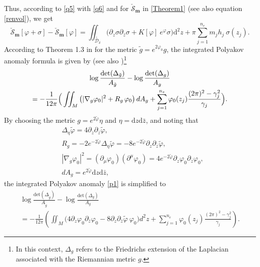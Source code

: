 \documentclass[a4paper,11pt]{article}
\newcommand{\dd}{\mathrm{d}}
\newcommand{\singfund}{\overset{{}_{\curlywedge}}{\mathcal{D}}}
\begin{document}
Thus, according to \eqref{q5} with \eqref{q6} and for $\check{\mathscr{S}}_{\boldsymbol{m}}$ in \eqref{Theorem1} (see also equation \eqref{renvol}), we get
\begin{equation}
\check{\mathscr{S}}_{\boldsymbol{m}}[\varphi+\sigma]-\check{\mathscr{S}}_{\boldsymbol{m}}[\varphi] = \iint_{\singfund_{\delta}}\Big(\partial_z \sigma\partial_{\bar{z}}\sigma +  K[\varphi] ~e^{\varphi} \sigma\Big) \dd^{2}z +\pi \sum_{j=1}^{n_e} m_j h_j~ \sigma(z_j).\label{q7}
\end{equation}
According to Theorem 1.3 in \cite{aldana2020polyakov} for the metric $\tilde{g}= e^{2\varphi_{0}}g$, the integrated Polyakov anomaly formula is given by (see also \cite{kalvin2021polyakov})\footnote{In this context, $\Delta_{g}$ refers to the Friedrichs extension of the Laplacian associated with the Riemannian metric $g$.}
\begin{multline}
\log\frac{\text{det}(\Delta_{\tilde{g}})}{A_{\tilde{g}}}- \log\frac{\text{det}(\Delta_{g})}{A_{g}}\\
=-\frac{1}{12\pi}\Big(\iint_{M}\left(|\nabla_{g}\varphi_0|^2 +  R_{g}\hspace{.5mm}\varphi_0\right) dA_g+ \sum_{j=1}^{n_
e}\varphi_0(z_j)\frac{(2\pi)^2-\gamma_{j}^2}{\gamma_j}\Big).\label{p1}
\end{multline}
By choosing the metric $g= e^{2\tilde{\varphi}}\eta$ and $\eta= \dd z \dd{\bar{z}}$, and noting that
\begin{equation}
\begin{split}
&\Delta_{\eta}\tilde{\varphi} = 4\partial_{z}\partial_{\bar{z}}\tilde{\varphi},\\&
R_{g} = -2e^{-2\tilde{\varphi}}\Delta_{\eta}\tilde{\varphi} = -8e^{-2\tilde{\varphi}}\partial_{z}\partial_{\bar{z}}\tilde{\varphi},\\&
|\nabla_{g}\varphi_0|^2 = (\partial_{\mu}\varphi_0)(\partial^{\mu}\varphi_0) =  4 e^{-2\tilde{\varphi}}\partial_{z}\varphi_0\partial_{\bar{z}}\varphi_0,\\&
dA_g = e^{2\tilde{\varphi}}\dd z\dd\bar{z},
\end{split}
\end{equation}
the integrated Polyakov anomaly \eqref{p1} is simplified to
\begin{multline}
\log\frac{\text{det}(\Delta_{\tilde{g}})}{A_{\tilde{g}}}- \log\frac{\text{det}(\Delta_{g})}{A_{g}}\\
=-\frac{1}{12\pi}\left(\iint_{M}\Big(4 \partial_{z}\varphi_0\partial_{\bar{z}}\varphi_0   -8\partial_{z}\partial_{\bar{z}}\tilde{\varphi} ~\varphi_0\Big) d^{2}z+ \sum_{j=1}^{n_
	e}\varphi_0(z_j)\frac{(2\pi)^2-\gamma_{j}^2}{\gamma_j}\right).\label{p2}
\end{multline}
\end{document}
